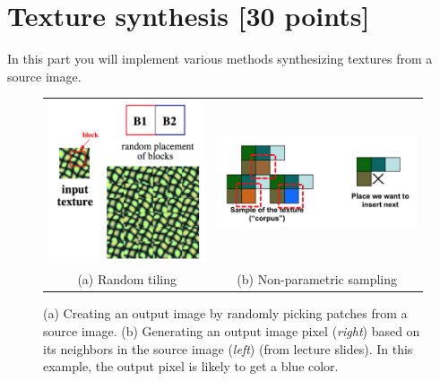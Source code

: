 \documentclass[10pt,letterpaper]{article}
\begin{document}
\section{Texture synthesis [30 points]}

In this part you will implement various methods synthesizing textures
from a source image.


\begin{figure}[h]
\centering     
\begin{tabular}{cc}
\includegraphics[width=0.25\linewidth]{random-patches.png} & 
\includegraphics[width=0.5\linewidth]{pixel_neighbor.png} \\ 
(a) Random tiling & (b) Non-parametric sampling \\
\end{tabular}

\caption{\label{fig:image-synth} (a) Creating an output image by
  randomly picking patches from a source image. (b) Generating an
  output image pixel (\textit{right}) based on its neighbors in the
  source image (\textit{left}) (from lecture slides). In this example,
  the output pixel is likely to get a blue color.}

\end{figure}
\end{document}
